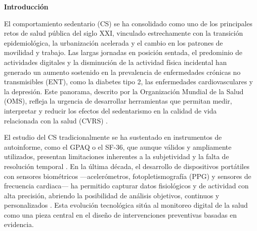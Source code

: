 % 

\begin{center}
{\fontsize{12}{14}\selectfont\bfseries Introducción}\\[24pt]
\end{center}
\label{cap:introduccion}
\justifying
\setlength{\parskip}{0pt}

%

\noindent El comportamiento sedentario (CS) se ha consolidado como uno de los principales retos de salud pública del siglo XXI, vinculado estrechamente con la transición epidemiológica, la urbanización acelerada y el cambio en los patrones de movilidad y trabajo. Las largas jornadas en posición sentada, el predominio de actividades digitales y la disminución de la actividad física incidental han generado un aumento sostenido en la prevalencia de enfermedades crónicas no transmisibles (ENT), como la diabetes tipo 2, las enfermedades cardiovasculares y la depresión. Este panorama, descrito por la Organización Mundial de la Salud (OMS), refleja la urgencia de desarrollar herramientas que permitan medir, interpretar y reducir los efectos del sedentarismo en la calidad de vida relacionada con la salud (CVRS) \cite{WHO2020,Bull2020,Guthold2020}.

El estudio del CS tradicionalmente se ha sustentado en instrumentos de autoinforme, como el GPAQ o el SF-36, que aunque válidos y ampliamente utilizados, presentan limitaciones inherentes a la subjetividad y la falta de resolución temporal \cite{Romero2022,ShamahLevy2023}. En la última década, el desarrollo de dispositivos portátiles con sensores biométricos —acelerómetros, fotopletismografía (PPG) y sensores de frecuencia cardiaca— ha permitido capturar datos fisiológicos y de actividad con alta precisión, abriendo la posibilidad de análisis objetivos, continuos y personalizados \cite{Henriksen2018,White2019,Strain2020}. Esta evolución tecnológica sitúa al monitoreo digital de la salud como una pieza central en el diseño de intervenciones preventivas basadas en evidencia.

